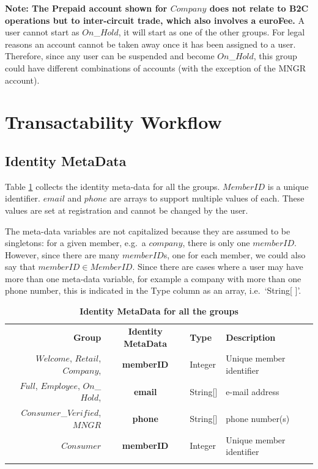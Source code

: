 \textbf{Note: The Prepaid account shown for $Company$ does not relate to B2C operations but to inter-circuit trade, which also involves a euroFee.} A user cannot start as $On$\_$Hold$, it will start as one of the other groups. For legal reasons an account cannot be taken away once it has been assigned to a user. Therefore, since any user can be suspended and become $On$\_$Hold$, this group could have different combinations of accounts (with the exception of the MNGR account).

\section{Transactability Workflow}
\subsection{Identity MetaData}
Table \ref{tab:IdentityMetaData} collects the identity meta-data for all the groups. $MemberID$ is a unique identifier. $email$ and $phone$ are arrays to support multiple values of each. These values are set at registration and cannot be changed by the user.

The meta-data variables are not capitalized because they are assumed to be singletons: for a given member, e.g.\ a $company$, there is only one $memberID$. However, since there are many $memberID$s, one for each member, we could also say that $memberID \in MemberID$. Since there are cases where a user may have more than one meta-data variable, for example a company with more than one phone number, this is indicated in the Type column as an array, i.e.\ `String[ ]'.

\begin{table}[H]
\vspace{-0.3cm}
\begin{centering}
\small
{
\begin{tabular}{ r | c | l | l }
\hline
\textbf{Group}	& {\bf Identity MetaData} & {\bf Type} & {\bf Description} \\
\Xhline{1.5pt}
$Welcome$, $Retail$, $Company$,	& {\bf memberID}			&Integer	& Unique member identifier \\
$Full$, $Employee$, $On$\_$Hold$,	& {\bf email}				&String[]	& e-mail address \\		
$Consumer$\_$Verified$, $MNGR$	& {\bf phone}				&String[]	& phone number(s) \\
\hline
$Consumer$	& {\bf memberID}	&Integer & Unique member identifier \\
\Xhline{1.5pt}
\end{tabular}
}
\caption{\small\textbf{Identity MetaData for all the groups}}
\label{tab:IdentityMetaData}
\end{centering}
\vspace{-1.2cm}
\end{table}

